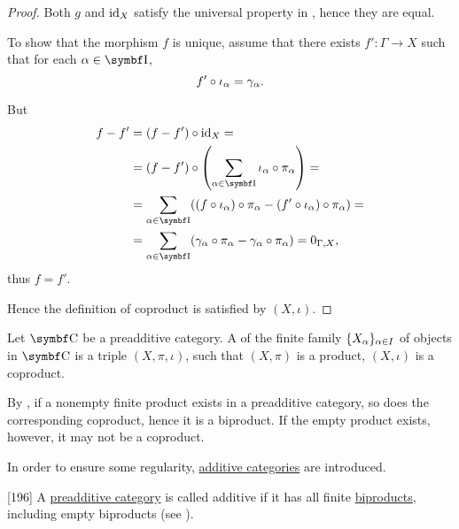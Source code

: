 \begin{proof}
  Both \( g \) and \( \operatorname{id}_X \) satisfy the universal property in , hence they are equal.

  To show that the morphism \( f \) is unique, assume that there exists \( f': \Gamma \to X \) such that for each \( \al \in \Cat{I} \),
  \begin{equation*}
    f' \circ \iota_\alpha = \gamma_\alpha.
  \end{equation*}

  But
  \begin{align*}
    f - f'
    &=
    (f - f') \circ \Id_X
    = \\ &=
    (f - f') \circ \left( \sum_{\al \in \Cat{I}} \iota_\al \circ \pi_\al \right)
    = \\ &=
    \sum_{\al \in \Cat{I}} ((f \circ \iota_\al) \circ \pi_\al - (f' \circ \iota_\al) \circ \pi_\al)
    = \\ &=
    \sum_{\al \in \Cat{I}} (\gamma_\al \circ \pi_\al - \gamma_\al \circ \pi_\al)
    =
    0_{\Gamma,X},
  \end{align*}
  thus \( f = f' \).

  Hence the definition of coproduct is satisfied by \( (X, \iota) \).
\end{proof}

\begin{definition}\label{def:categorical_biproduct}
  Let \( \Cat{C} \) be a preadditive category. A  of the finite family \( \{ X_\alpha \}_{\alpha \in I} \) of objects in \( \Cat{C} \) is a triple \( (X, \pi, \iota) \), such that \( (X, \pi) \) is a product, \( (X, \iota) \) is a coproduct.
\end{definition}

\begin{remark}\label{remark:preadditive_category_biproducts}
  By , if a nonempty finite product exists in a preadditive category, so does the corresponding coproduct, hence it is a biproduct. If the empty product exists, however, it may not be a coproduct.

  In order to ensure some regularity, \hyperref[def:additive_category]{additive categories} are introduced.
\end{remark}

\begin{definition}\label{def:additive_category}\cite{MacLane1994}[196]
  A \hyperref[def:preadditive_category]{preadditive category} is called additive if it has all finite \hyperref[def:categorical_biproduct]{biproducts}, including empty biproducts (see ).
\end{definition}

